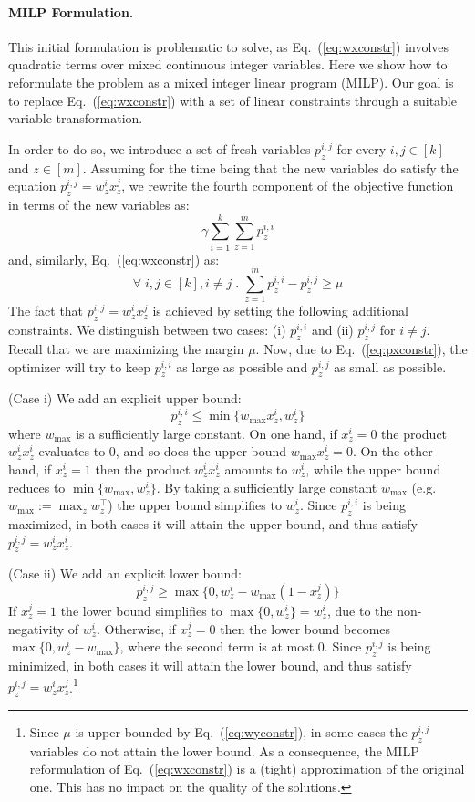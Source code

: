 \documentclass{article}
\renewcommand\[{\begin{equation}}
\renewcommand\]{\end{equation}}
\begin{document}
\paragraph{MILP Formulation.} This initial formulation is problematic to solve,
as Eq.~(\ref{eq:wxconstr}) involves quadratic terms over mixed continuous integer variables. 
Here we show how to reformulate the
problem as a mixed integer linear program (MILP). Our goal is to
replace Eq.~(\ref{eq:wxconstr}) with a set of linear constraints through
a suitable variable transformation.

In order to do so, we introduce a set of fresh variables $p^{i,j}_z$ for every
$i,j\in[k]$ and $z\in[m]$. Assuming for the time being that the new variables
do satisfy the equation $p^{i,j}_z = w^i_z x^j_z$, we rewrite the fourth
component of the objective function in terms of the new variables as:
%
$$ \gamma \sum_{i=1}^k \sum_{z=1}^m p^{i,i}_z $$
%
and, similarly, Eq.~(\ref{eq:wxconstr}) as:
%
\[ \forall \; i, j \in [k], i \neq j \;.\; \sum_{z=1}^m p^{i,i}_z - p^{i,j}_z \ge \mu \label{eq:pxconstr} \]
%
The fact that $p^{i,j}_z = w^{i}_z x^{j}_z$ is achieved by
setting the following additional constraints. We distinguish between two cases:
(i) $p^{i,i}_z$ and (ii) $p^{i,j}_z$ for $i \ne j$.  Recall that we are
maximizing the margin $\mu$. Now, due to Eq.~(\ref{eq:pxconstr}), the optimizer will
try to keep $p^{i,i}_z$ as large as possible and $p^{i,j}_z$ as small as
possible.

(Case i) We add an explicit upper bound:
%
$$ p^{i,i}_z \le \min \{ w_\text{max} x^{i}_z, w^{i}_z \} $$
%
where $w_\text{max}$ is a sufficiently large constant.
On one hand, if $x^i_z = 0$ the product $w^i_z x^i_z$ evaluates to $0$, and so does
the upper bound $w_\text{max} x^{i}_z = 0$. On the other hand, if $x^i_z=1$
then the product $w^i_z x^i_z$ amounts to $w^i_z$, while the upper
bound reduces to $\min \{ w_\text{max}, w^{i}_z \}$. By taking a sufficiently
large constant $w_\text{max}$ (e.g. $w_\text{max} := \max_z w^\top_z$) the
upper bound simplifies to $w^i_z$. Since $p^{i,i}_z$ is being maximized, in
both cases it will attain the upper bound, and thus satisfy $p^{i,j}_z = w^i_z x^i_z$.

(Case ii) We add an explicit lower bound:
%
$$ p^{i,j}_z \ge \max \{ 0, w^{i}_z - w_\text{max}(1 - x^{j}_z) \} $$
%
If $x^j_z = 1$ the lower bound simplifies to $\max \{ 0, w^{i}_z \} = w^{i}_z$,
due to the non-negativity of $w^i_z$. Otherwise, if $x^j_z = 0$
then the lower bound becomes $\max \{ 0, w^{i}_z - w_\text{max} \}$, where
the second term is at most $0$. Since $p^{i,j}_z$ is being minimized, in both
cases it will attain the lower bound, and thus satisfy $p^{i,j}_z = w^i_z
x^j_z$.\footnote{Since $\mu$ is upper-bounded by Eq.~(\ref{eq:wyconstr}), in some
cases the $p^{i,j}_z$ variables do not attain the lower bound. As a
consequence, the MILP reformulation of Eq.~(\ref{eq:wxconstr}) is a (tight)
approximation of the original one. This has no impact on the quality of the
solutions.}
\end{document}
